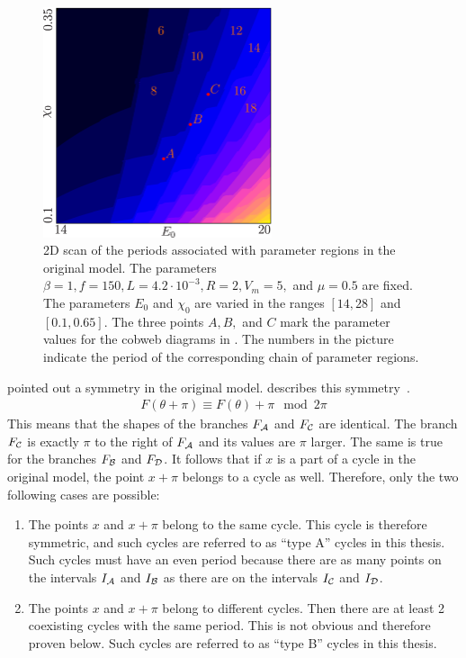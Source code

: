 \begin{figure}
	\centering
	\includegraphics[width=0.6\textwidth]{../Figures/2/2.3/result.png}
	\caption[2D scan of the periods associated with parameter regions in the original model]{
		2D scan of the periods associated with parameter regions in the original model.
		The parameters $\beta = 1, f = 150, L = 4.2 \cdot 10^{-3}, R = 2, V_m = 5,$ and $\mu = 0.5$ are fixed.
		The parameters $E_0$ and $\chi_0$ are varied in the ranges $[14, 28]$ and $[0.1, 0.65]$.
		The three points $A, B,$ and $C$ mark the parameter values for the cobweb diagrams in .
		The numbers in the picture indicate the period of the corresponding chain of parameter regions.
	}
	\label{fig:state.og.dynamics.period}
\end{figure}

 pointed out a symmetry in the original model.
 describes this symmetry~\cite{akyuz2022}.
\begin{align}
	F(\theta + \pi) \equiv F(\theta) + \pi \mod 2\pi \label{equ:state.og.sym}
\end{align}
This means that the shapes of the branches $F_{\mathcal{A}}$ and $F_{\mathcal{C}}$ are identical.
The branch $F_{\mathcal{C}}$ is exactly $\pi$ to the right of $F_{\mathcal{A}}$ and its values are $\pi$ larger.
The same is true for the branches $F_{\mathcal{B}}$ and $F_{\mathcal{D}}$.
It follows that if $x$ is a part of a cycle in the original model, the point $x + \pi$ belongs to a cycle as well.
Therefore, only the two following cases are possible:

\begin{enumerate}[label=(\Alph*)]
	\item The points $x$ and $x + \pi$ belong to the same cycle.
	      This cycle is therefore symmetric, and such cycles are referred to as ``type A'' cycles in this thesis.
	      Such cycles must have an even period because there are as many points on the intervals $I_{\mathcal{A}}$ and $I_{\mathcal{B}}$ as there are on the intervals $I_{\mathcal{C}}$ and $I_{\mathcal{D}}$.
	\item The points $x$ and $x + \pi$ belong to different cycles.
	      Then there are at least 2 coexisting cycles with the same period.
	      This is not obvious and therefore proven below.
	      Such cycles are referred to as ``type B'' cycles in this thesis.
\end{enumerate}

